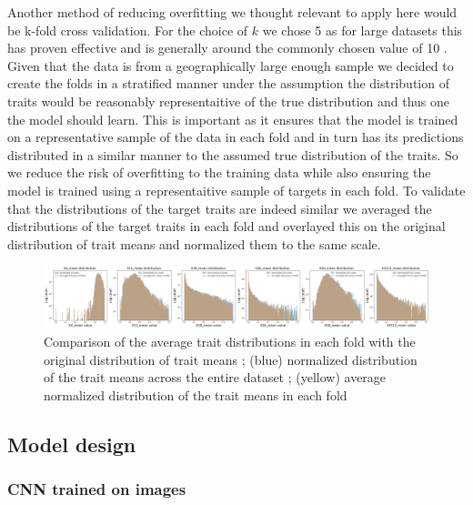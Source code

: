 \documentclass[12pt,a4paper,oneside]{article}
\begin{document}
Another method of reducing overfitting we thought relevant to apply here would be k-fold cross validation. For the choice of $k$ we chose 5 as for large datasets this has proven effective \cite{Marcot2021} and is generally around the commonly chosen value of 10 \cite{kequal10isgood}. Given that the data is from a geographically large enough sample we decided to create the folds in a stratified manner under the assumption the distribution of traits would be reasonably representaitive of the true distribution and thus one the model should learn. This is important as it ensures that the model is trained on a representative sample of the data in each fold and in turn has its predictions distributed in a similar manner to the assumed true distribution of the traits. So we reduce the risk of overfitting to the training data while also ensuring the model is trained using a representaitive sample of targets in each fold. To validate that the distributions of the target traits are indeed similar we averaged the distributions of the target traits in each fold and overlayed this on the original distribution of trait means and normalized them to the same scale. 

\begin{figure}[!h]
    \centering
    \includegraphics[width=1\textwidth]{assets/distribution_match_folds.png}
    \caption{Comparison of the average trait distributions in each fold with the original distribution of trait means ; (blue) normalized distribution of the trait means across the entire dataset ; (yellow) average normalized distribution of the trait means in each fold}
\end{figure}

\subsection{Model design}

\subsubsection{CNN trained on images}
\end{document}

